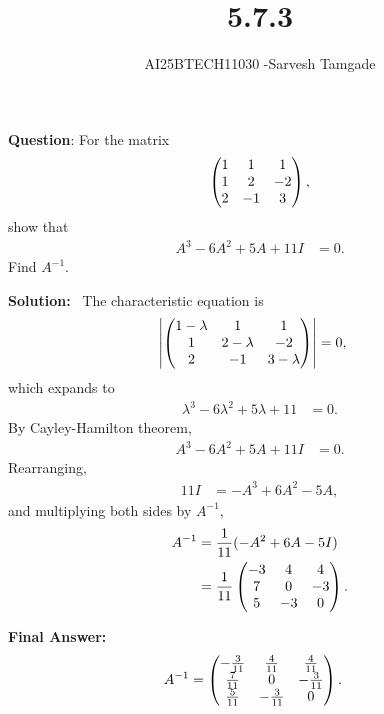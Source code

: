 \documentclass[journal]{IEEEtran}
\begin{document}

\vspace{3cm}

\title{5.7.3}
\author{AI25BTECH11030 -Sarvesh Tamgade}
{\let\newpage\relax\maketitle}

\renewcommand{\thefigure}{\theenumi}
\renewcommand{\thetable}{\theenumi}
\setlength{\intextsep}{10pt} 


\renewcommand{\thetable}{\theenumi}


\textbf{Question}: For the matrix
\[
\begin{pmatrix}
1 & 1 & 1 \\
1 & 2 & -2 \\
2 & -1 & 3
\end{pmatrix},
\]
show that
\begin{align}
A^3 - 6A^2 + 5A + 11I &= 0.
\end{align}
Find \(A^{-1}\).


\textbf{Solution:} \
The characteristic equation is
\begin{align}
\left|\begin{pmatrix}
1-\lambda & 1 & 1 \\
1 & 2-\lambda & -2 \\
2 & -1 & 3-\lambda
\end{pmatrix} \right| &= 0,
\end{align}
which expands to
\begin{align}
\lambda^3 - 6 \lambda^2 + 5 \lambda + 11 &= 0.
\end{align}
By Cayley-Hamilton theorem,
\begin{align}
A^3 - 6A^2 + 5A + 11I &= 0.
\end{align}
Rearranging,
\begin{align}
11I &= -A^3 + 6A^2 - 5A,
\end{align}
and multiplying both sides by \(A^{-1}\),
\begin{align}
A^{-1} &= \frac{1}{11}(-A^2 + 6A - 5I) \\
&= \frac{1}{11} \begin{pmatrix}
-3 & 4 & 4 \\
7 & 0 & -3 \\
5 & -3 & 0
\end{pmatrix}.
\end{align}

\textbf{Final Answer:}
\begin{align}
A^{-1} &= \begin{pmatrix}
-\frac{3}{11} & \frac{4}{11} & \frac{4}{11} \\
\frac{7}{11} & 0 & -\frac{3}{11} \\
\frac{5}{11} & -\frac{3}{11} & 0
\end{pmatrix}.
\end{align}
\end{document}
